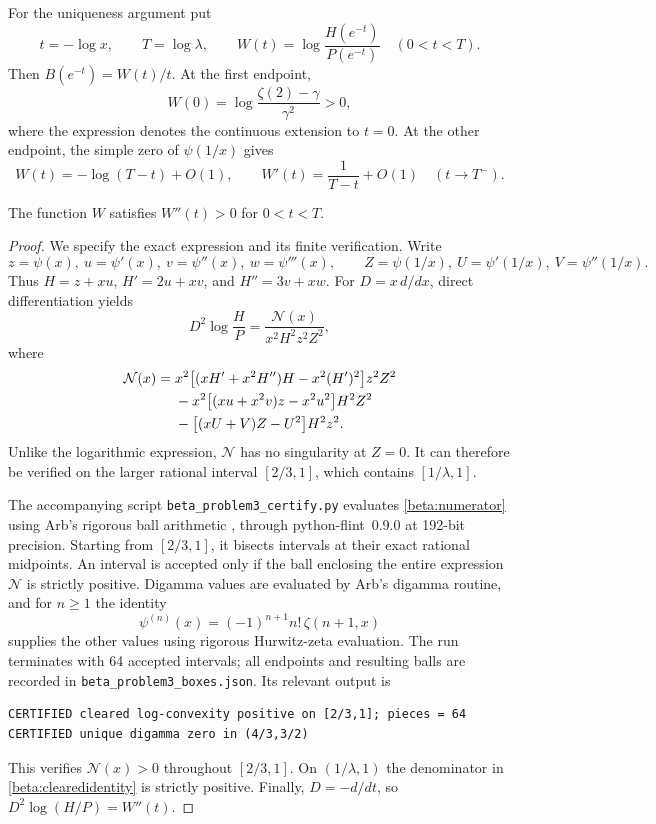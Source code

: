 For the uniqueness argument put
\[
 t=-\log x,\qquad T=\log\lambda,\qquad
 W(t)=\log\frac{H(e^{-t})}{P(e^{-t})}\quad(0<t<T).
\]
Then $B(e^{-t})=W(t)/t$. At the first endpoint,
\[
 W(0)=\log\frac{\zeta(2)-\gamma}{\gamma^2}>0,
\]
where the expression denotes the continuous extension to $t=0$.
At the other endpoint, the simple zero of $\psi(1/x)$ gives
\begin{equation}\label{beta:Wend}
 W(t)=-\log(T-t)+O(1),\qquad
 W'(t)=\frac1{T-t}+O(1)\quad(t\to T^-).
\end{equation}

\begin{lemma}\label{beta:certified-lemma}
The function $W$ satisfies $W''(t)>0$ for $0<t<T$.
\end{lemma}

\begin{proof}
We specify the exact expression and its finite verification.
Write
\[
 z=\psi(x),\ u=\psi'(x),\ v=\psi''(x),\ w=\psi'''(x),\qquad
 Z=\psi(1/x),\ U=\psi'(1/x),\ V=\psi''(1/x).
\]
Thus $H=z+xu$, $H'=2u+xv$, and $H''=3v+xw$.
For $D=x\,d/dx$, direct differentiation yields
\begin{equation}\label{beta:clearedidentity}
 D^2\log\frac HP=\frac{\mathcal N(x)}{x^2H^2z^2Z^2},
\end{equation}
where
\begin{align}
 \mathcal N(x)={}&
 x^2\bigl[(xH'+x^2H'')H-x^2(H')^2\bigr]z^2Z^2\notag\\
 &-x^2\bigl[(xu+x^2v)z-x^2u^2\bigr]H^2Z^2\notag\\
 &-\bigl[(xU+V)Z-U^2\bigr]H^2z^2.
 \label{beta:numerator}
\end{align}
Unlike the logarithmic expression, $\mathcal N$ has no singularity at
$Z=0$. It can therefore be verified on the larger rational interval
$[2/3,1]$, which contains $[1/\lambda,1]$.

The accompanying script \texttt{beta\_problem3\_certify.py} evaluates
\eqref{beta:numerator} using Arb's rigorous ball arithmetic
\cite{Johansson2017}, through python-flint~0.9.0 at 192-bit precision.
Starting from $[2/3,1]$, it bisects intervals at their exact rational midpoints.
An interval is accepted only if the ball enclosing the entire expression
$\mathcal N$ is strictly positive. Digamma values are evaluated by Arb's
digamma routine, and for $n\geq1$ the identity
\[
 \psi^{(n)}(x)=(-1)^{n+1}n!\,\zeta(n+1,x)
\]
supplies the other values using rigorous Hurwitz-zeta evaluation.
The run terminates with 64 accepted intervals; all endpoints and resulting
balls are recorded in \texttt{beta\_problem3\_boxes.json}. Its relevant
output is
\begin{verbatim}
CERTIFIED cleared log-convexity positive on [2/3,1]; pieces = 64
CERTIFIED unique digamma zero in (4/3,3/2)
\end{verbatim}
This verifies $\mathcal N(x)>0$ throughout $[2/3,1]$.
On $(1/\lambda,1)$ the denominator in \eqref{beta:clearedidentity} is
strictly positive. Finally, $D=-d/dt$, so $D^2\log(H/P)=W''(t)$.
\end{proof}

